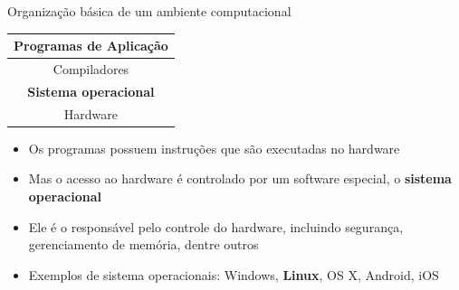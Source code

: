 \documentclass[handout]{beamer}
\begin{document}
\begin{frame}{Organização básica de um ambiente computacional}

    \begin{center}
        \begin{tabular}{|c|} \hline
            Programas de Aplicação \\\hline
            Compiladores \\\hline
            \textbf{Sistema operacional} \\\hline
            Hardware \\\hline
        \end{tabular}
    \end{center}

    \begin{itemize}[<+->]
        \item Os programas possuem instruções que são executadas no hardware
        \item Mas o acesso ao hardware é controlado por um software especial, o \textbf{sistema operacional}
        \item Ele é o responsável pelo controle do hardware, incluindo segurança, gerenciamento de memória, dentre outros
        \item Exemplos de sistema operacionais: Windows, \textbf{Linux}, OS X, Android, iOS
    \end{itemize}
\end{frame}
\end{document}
